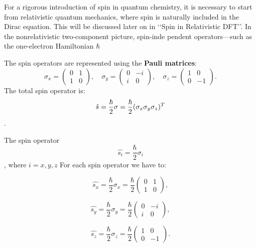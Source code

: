 \documentclass[%
 preprint, linenumbers,
 amsmath,amssymb,
 aps, physrev,
]{revtex4-2}
\begin{document}
For a rigorous introduction of spin in quantum chemistry, it is necessary to start from relativistic quantum mechanics, where spin is naturally included in the Dirac equation. This will be discussed later on in ‘‘Spin in Relativistic DFT’’. In the nonrelativistic two-component picture, spin-inde pendent operators—such as the one-electron Hamiltonian $\hbar$

The spin operators are represented using the \textbf{Pauli matrices}:
\[
\sigma_x = 
\begin{pmatrix} 
0 & 1 \\ 
1 & 0 
\end{pmatrix}, \quad
\sigma_y = 
\begin{pmatrix} 
0 & -i \\ 
i & 0 
\end{pmatrix}, \quad
\sigma_z = 
\begin{pmatrix} 
1 & 0 \\ 
0 & -1 
\end{pmatrix}.
\]
The total spin operator is:
\[\hat{s} = \frac{\hbar}{2} \sigma
= \frac{\hbar}{2} (\sigma_x \\ 
\sigma_y \\ 
\sigma_z)^{T} \].

The spin operator
\[ \hat{s_i} = \frac{\hbar}{2}\sigma_i \],
where $i=x,y,z$ For each spin operator we have to: 

\begin{equation}
    \hat{s_x}= \frac{\hbar}{2}\sigma_x= \frac{\hbar}{2} \begin{pmatrix}
        0 & 1 \\
        1 & 0
    \end{pmatrix},
\end{equation}


\begin{equation}
    \hat{s_y}= \frac{\hbar}{2}\sigma_y= \frac{\hbar}{2} \begin{pmatrix}
        0 & -i \\
        i & 0
    \end{pmatrix},
\end{equation}

\begin{equation}
    \hat{s_z}= \frac{\hbar}{2}\sigma_z= \frac{\hbar}{2} \begin{pmatrix}
        1 & 0 \\
        0 & -1
    \end{pmatrix}. 
\end{equation}
\end{document}
